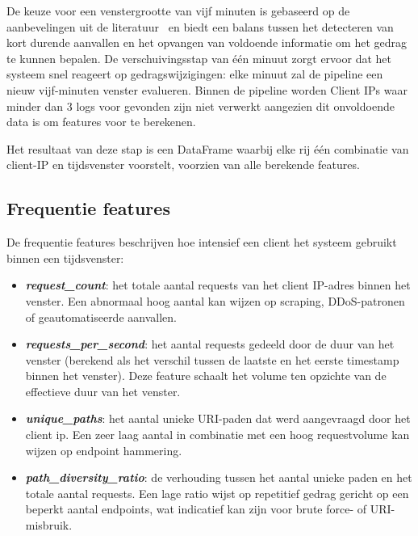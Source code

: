De keuze voor een venstergrootte van vijf minuten is gebaseerd op de aanbevelingen uit de literatuur~\autocite{Schummer2024} en biedt een balans tussen het detecteren van kort durende aanvallen en het opvangen van voldoende informatie om het gedrag te kunnen bepalen. De verschuivingsstap van één minuut zorgt ervoor dat het systeem snel reageert op gedragswijzigingen: elke minuut zal de pipeline een nieuw vijf-minuten venster evalueren. Binnen de pipeline worden Client IPs waar minder dan 3 logs voor gevonden zijn niet verwerkt aangezien dit onvoldoende data is om features voor te berekenen. 

Het resultaat van deze stap is een DataFrame waarbij elke rij één combinatie van client-IP en tijdsvenster voorstelt, voorzien van alle berekende features.

\subsection{Frequentie features}
\label{subsec:frequentiekenmerken}

De frequentie features beschrijven hoe intensief een client het systeem gebruikt binnen een tijdsvenster:

\begin{itemize}
    \item \textbf{\textit{request\_count}}: het totale aantal requests van het client IP-adres binnen het venster. Een abnormaal hoog aantal kan wijzen op scraping, DDoS-patronen of geautomatiseerde aanvallen.
    \item \textbf{\textit{requests\_per\_second}}: het aantal requests gedeeld door de duur van het venster (berekend als het verschil tussen de laatste en het eerste timestamp binnen het venster). Deze feature schaalt het volume ten opzichte van de effectieve duur van het venster.
    \item \textbf{\textit{unique\_paths}}: het aantal unieke URI-paden dat werd aangevraagd door het client ip. Een zeer laag aantal in combinatie met een hoog requestvolume kan wijzen op endpoint hammering.
    \item \textbf{\textit{path\_diversity\_ratio}}: de verhouding tussen het aantal unieke paden en het totale aantal requests. Een lage ratio wijst op repetitief gedrag gericht op een beperkt aantal endpoints, wat indicatief kan zijn voor brute force- of URI-misbruik.
\end{itemize}


